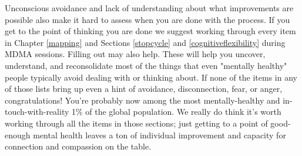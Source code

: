 \documentclass[12pt,letterpaper]{book}
\begin{document}
Unconscious avoidance and lack of understanding about what improvements are possible also make it hard to assess when you are done with the process. If you get to the point of thinking you are done we suggest working through every item in Chapter \ref{mapping} and Sections \ref{stopcycle} and \ref{cognitiveflexibility} during MDMA sessions. Filling out \textcite{maladaptiveSchemaScale} may also help. These will help you uncover, understand, and reconsolidate most of the things that even "mentally healthy" people typically avoid dealing with or thinking about. If none of the items in any of those lists bring up even a hint of avoidance, disconnection, fear, or anger, congratulations! You're probably now among the most mentally-healthy and in-touch-with-reality 1\% of the global population. We really do think it's worth working through all the items in those sections; just getting to a point of good-enough mental health leaves a ton of individual improvement and capacity for connection and compassion on the table.
\end{document}
